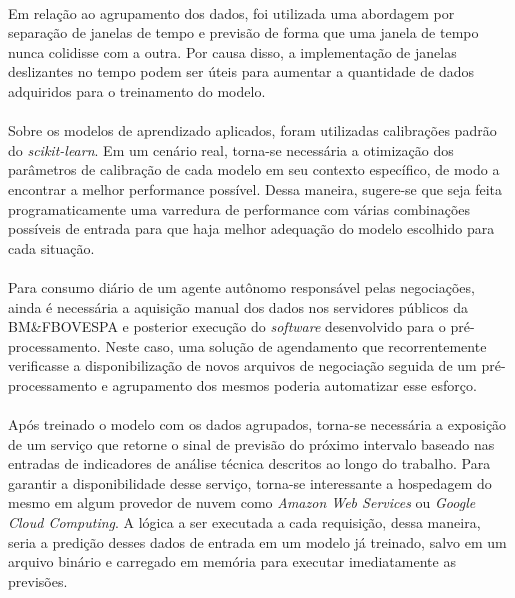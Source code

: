 \documentclass[grad,numbers]{coppe}
\begin{document}
        \paragraph{}Em relação ao agrupamento dos dados, foi utilizada uma abordagem por separação de janelas de tempo e previsão de forma que uma janela de tempo nunca colidisse com a outra. Por causa disso, a implementação de janelas deslizantes no tempo podem ser úteis para aumentar a quantidade de dados adquiridos para o treinamento do modelo.
        
        \paragraph{}Sobre os modelos de aprendizado aplicados, foram utilizadas calibrações padrão do \textit{scikit-learn}. Em um cenário real, torna-se necessária a otimização dos parâmetros de calibração de cada modelo em seu contexto específico, de modo a encontrar a melhor performance possível. Dessa maneira, sugere-se que seja feita programaticamente uma varredura de performance com várias combinações possíveis de entrada para que haja melhor adequação do modelo escolhido para cada situação.
        
        \paragraph{}Para consumo diário de um agente autônomo responsável pelas negociações, ainda é necessária a aquisição manual dos dados nos servidores públicos da BM\&FBOVESPA e posterior execução do \textit{software} desenvolvido para o pré-processamento. Neste caso, uma solução de agendamento que recorrentemente verificasse a disponibilização de novos arquivos de negociação seguida de um pré-processamento e agrupamento dos mesmos poderia automatizar esse esforço.
        
        \paragraph{}Após treinado o modelo com os dados agrupados, torna-se necessária a exposição de um serviço que retorne o sinal de previsão do próximo intervalo baseado nas entradas de indicadores de análise técnica descritos ao longo do trabalho. Para garantir a disponibilidade desse serviço, torna-se interessante a hospedagem do mesmo em algum provedor de nuvem como \textit{Amazon Web Services} ou \textit{Google Cloud Computing}. A lógica a ser executada a cada requisição, dessa maneira, seria a predição desses dados de entrada em um modelo já treinado, salvo em um arquivo binário e carregado em memória para executar imediatamente as previsões.
        
\end{document}

